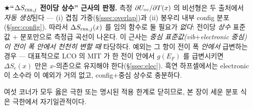 \begin{keybox}
★\textbf{``$\Delta S_{\mathrm{rxn},j}$ 전이당 상수'' 근사의 판정.} 측정 $\partial U_{\mathrm{oc}}/\partial T(x)$ 의 비선형은 두
출처에서 \emph{자동 생성}된다 --- (i) 겹침 가중(\S\ref{ssec:overlap})과 (ii) 봉우리 내부 config 분포
(\S\ref{sec:config}). 따라서 $\Delta S_{\mathrm{rxn},j}(x)$ 를 임의 함수로 둘 필요가 \emph{없다}: 전이당 \emph{상수}
표준값 $+$ 분포만으로 측정급 곡선이 나온다. 이 근사는 \emph{중심 표준값(vib$+$electronic 중심)이 전이 폭 안에서
천천히 변할 때} 타당하다. 예외는 그 항이 전이 폭 \emph{안에서} 급변하는 경우 --- 대표적으로 LCO 의 MIT 가 한
전이 안에서 $g(E_F)$ 를 급변시키면 $\Delta S_e(x)$ 만은 $x$-의존으로 유지해야 한다(\S\ref{ssec:elec}). 흑연
하프셀에서는 electronic 이 소수라 이 예외가 거의 없고, config$+$중심 상수로 충분하다.
\end{keybox}

여섯 코너가 모두 옳은 극한 또는 명시된 적용 한계로 닫히므로, 본 장이 세운 분포 식은 극한에서 자기일관적이다.

